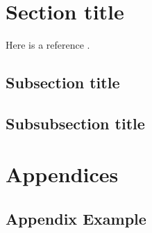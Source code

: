 \documentclass[a4paper]{article}
\begin{document}






\newpage
\tableofcontents
\newpage



\section{Section title}

Here is a reference \cite{ref_example}.


\subsection{Subsection title}


\subsection{Subsubsection title}


\newpage
\appendix

\section{Appendices}

\newpage
\subsection{Appendix Example}




\newpage
\printbibliography
\end{document}
